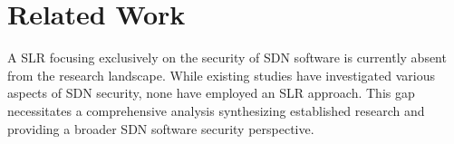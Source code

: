 \section{Related Work}\label{sec:rw}
A SLR focusing exclusively on the security of SDN software is currently absent from the research landscape. While existing studies have investigated various aspects of SDN security, none have employed an SLR approach. This gap necessitates a comprehensive analysis synthesizing established research and providing a broader SDN software security perspective.


